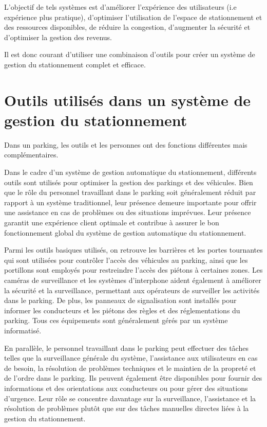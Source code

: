 L'objectif de tels systèmes est d'améliorer l'expérience des utilisateurs (i.e expérience plus pratique), d'optimiser l'utilisation de l'espace de stationnement et des ressources disponibles, de réduire la congestion, d'augmenter la sécurité et d'optimiser la gestion des revenus.

Il est donc courant d'utiliser une combinaison d'outils pour créer un système de gestion du stationnement complet et efficace. 


\section{Outils utilisés dans un système de gestion du stationnement}
Dans un parking, les outils et les personnes ont des fonctions différentes mais complémentaires.

Dans le cadre d'un système de gestion automatique du stationnement, différents outils sont utilisés pour optimiser la gestion des parkings et des véhicules. Bien que le rôle du personnel travaillant dans le parking soit généralement réduit par rapport à un système traditionnel, leur présence demeure importante pour offrir une assistance en cas de problèmes ou des situations imprévues. Leur présence garantit une expérience client optimale et contribue à assurer le bon fonctionnement global du système de gestion automatique du stationnement.

Parmi les outils basiques utilisés, on retrouve les barrières et les portes tournantes qui sont utilisées pour contrôler l'accès des véhicules au parking, ainsi que les portillons sont employés pour restreindre l'accès des piétons à certaines zones. Les caméras de surveillance et les systèmes d'interphone aident également à améliorer la sécurité et la surveillance, permettant aux opérateurs de surveiller les activités dans le parking. De plus, les panneaux de signalisation sont installés pour informer les conducteurs et les piétons des règles et des réglementations du parking. Tous ces équipements sont généralement gérés par un système informatisé.

En parallèle, le personnel travaillant dans le parking peut effectuer des tâches telles que la surveillance générale du système, l'assistance aux utilisateurs en cas de besoin, la résolution de problèmes techniques et le maintien de la propreté et de l'ordre dans le parking. Ils peuvent également être disponibles pour fournir des informations et des orientations aux conducteurs ou pour gérer des situations d'urgence. Leur rôle se concentre davantage sur la surveillance, l'assistance et la résolution de problèmes plutôt que sur des tâches manuelles directes liées à la gestion du stationnement.

